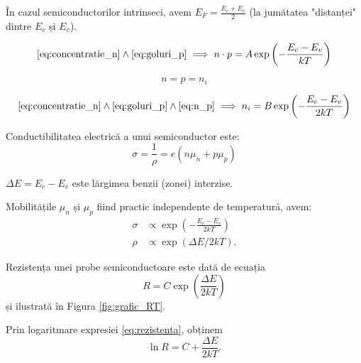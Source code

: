 \documentclass[a4paper]{article}
\begin{document}
În cazul semiconductorilor intrinseci, avem $E_F = \frac{E_c + E_v}{2}$ (la
jumătatea "distanței" dintre $E_c$ și $E_v$). %

\begin{equation}
	\eqref{eq:concentratie_n} \land \eqref{eq:goluri_p} \implies
	n \cdot p = A \exp\left( - \frac{E_c - E_v}{kT} \right)
\end{equation}

\begin{equation}
	n = p = n_i \label{eq:n_p}
\end{equation}

\begin{equation}
	\eqref{eq:concentratie_n} \land \eqref{eq:goluri_p} \land \eqref{eq:n_p}
	\implies n_i = B \exp\left( - \frac{E_c - E_v}{2kT} \right)
\end{equation}

Conductibilitatea electrică a unui semiconductor este:
\begin{equation}
	\sigma = \frac{1}{\rho} = e(n\mu_n + p\mu_p)
\end{equation}

$\Delta E = E_c - E_v$ este lărgimea benzii (zonei) interzise.

Mobilitățile $\mu_n$ și $\mu_p$ fiind practic independente de temperaturå, avem:
\begin{equation}
	\begin{aligned}
		\sigma & \propto \exp\left( - \frac{E_c - E_v}{2kT} \right) \\
		\rho   & \propto \exp\left( \Delta E / 2kT \right)
		\text{.}
	\end{aligned}
\end{equation}

Rezistența unei probe semiconductoare este dată de ecuația
\begin{equation}
	R = C \exp\left( \frac{\Delta E}{2kT} \right)
	\label{eq:rezistenta}
\end{equation}
și ilustrată în Figura \ref{fig:grafic_RT}.

Prin logaritmare expresiei \eqref{eq:rezistenta}, obținem
\begin{equation}
	\ln R = C + \frac{\Delta E}{2kT}
	\text{.}
\end{equation}
\end{document}
